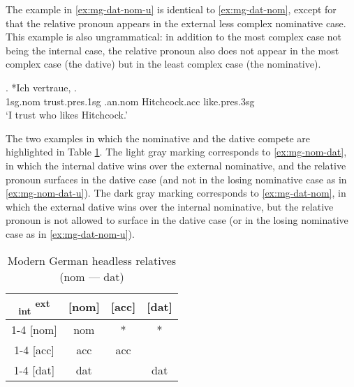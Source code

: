 The example in \ref{ex:mg-dat-nom-u} is identical to \ref{ex:mg-dat-nom}, except for that the relative pronoun appears in the external less complex nominative case. This example is also ungrammatical: in addition to the most complex case not being the internal case, the relative pronoun also does not appear in the most complex case (the dative) but in the least complex case (the nominative).

\exg. *Ich vertraue,   .\\
1\ac{sg}.\ac{nom} trust.\ac{pres}.1\ac{sg}\scsub{[dat]} .\ac{an}.\ac{nom} Hitchcock.\ac{acc} like.\ac{pres}.3\ac{sg}\scsub{[nom]}\\
`I trust who likes Hitchcock.' \label{ex:mg-dat-nom-u}

The two examples in which the nominative and the dative compete are highlighted in Table \ref{tbl:case-competition-mg-nom-dat}.
The light gray marking corresponds to \ref{ex:mg-nom-dat}, in which the internal dative wins over the external nominative, and the relative pronoun surfaces in the dative case (and not in the losing nominative case as in \ref{ex:mg-nom-dat-u}).
The dark gray marking corresponds to \ref{ex:mg-dat-nom}, in which the external dative wins over the internal nominative, but the relative pronoun is not allowed to surface in the dative case (or in the losing nominative case as in \ref{ex:mg-dat-nom-u}).

\begin{table}[ht]
  \center
  \caption{Modern German headless relatives (\ac{nom} --- \ac{dat})}
  \begin{tabular}{c|c|c|c}
    \toprule
    \textsubscript{\ac{int}} \textsuperscript{\ac{ext}}
           & [\ac{nom}]
           & [\ac{acc}]
           & [\ac{dat}]
           \\ \cmidrule{1-4}
       [\ac{nom}]
           & \ac{nom}
           & *
           & \cellcolor{DG}*
           \\ \cmidrule{1-4}
       [\ac{acc}]
           & \ac{acc}
           & \ac{acc}
           &
           \\ \cmidrule{1-4}
       [\ac{dat}]
           & \cellcolor{LG}\ac{dat}
           &
           & \ac{dat}
           \\
     \bottomrule
  \end{tabular}
    \label{tbl:case-competition-mg-nom-dat}
\end{table}


